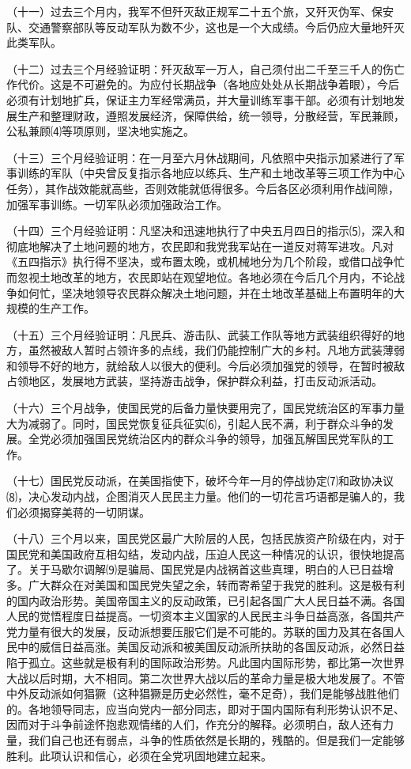 \documentclass[UTF-8, a5paper, 12pt]{ctexart}
\begin{document}
（十一）过去三个月内，我军不但歼灭敌正规军二十五个旅，又歼灭伪军、保安队、交通警察部队等反动军队为数不少，这也是一个大成绩。今后仍应大量地歼灭此类军队。

（十二）过去三个月经验证明：歼灭敌军一万人，自己须付出二千至三千人的伤亡作代价。这是不可避免的。为应付长期战争（各地应处处从长期战争着眼），今后必须有计划地扩兵，保证主力军经常满员，并大量训练军事干部。必须有计划地发展生产和整理财政，遵照发展经济，保障供给，统一领导，分散经营，军民兼顾，公私兼顾⑷等项原则，坚决地实施之。

（十三）三个月经验证明：在一月至六月休战期间，凡依照中央指示加紧进行了军事训练的军队（中央曾反复指示各地应以练兵、生产和土地改革等三项工作为中心任务），其作战效能就高些，否则效能就低得很多。今后各区必须利用作战间隙，加强军事训练。一切军队必须加强政治工作。

（十四）三个月经验证明：凡坚决和迅速地执行了中央五月四日的指示⑸，深入和彻底地解决了土地问题的地方，农民即和我党我军站在一道反对蒋军进攻。凡对《五四指示》执行得不坚决，或布置太晚，或机械地分为几个阶段，或借口战争忙而忽视土地改革的地方，农民即站在观望地位。各地必须在今后几个月内，不论战争如何忙，坚决地领导农民群众解决土地问题，并在土地改革基础上布置明年的大规模的生产工作。

（十五）三个月经验证明：凡民兵、游击队、武装工作队等地方武装组织得好的地方，虽然被敌人暂时占领许多的点线，我们仍能控制广大的乡村。凡地方武装薄弱和领导不好的地方，就给敌人以很大的便利。今后必须加强党的领导，在暂时被敌占领地区，发展地方武装，坚持游击战争，保护群众利益，打击反动派活动。

（十六）三个月战争，使国民党的后备力量快要用完了，国民党统治区的军事力量大为减弱了。同时，国民党恢复征兵征实⑹，引起人民不满，利于群众斗争的发展。全党必须加强国民党统治区内的群众斗争的领导，加强瓦解国民党军队的工作。

（十七）国民党反动派，在美国指使下，破坏今年一月的停战协定⑺和政协决议⑻，决心发动内战，企图消灭人民民主力量。他们的一切花言巧语都是骗人的，我们必须揭穿美蒋的一切阴谋。

（十八）三个月以来，国民党区最广大阶层的人民，包括民族资产阶级在内，对于国民党和美国政府互相勾结，发动内战，压迫人民这一种情况的认识，很快地提高了。关于马歇尔调解⑼是骗局、国民党是内战祸首这些真理，明白的人已日益增多。广大群众在对美国和国民党失望之余，转而寄希望于我党的胜利。这是极有利的国内政治形势。美国帝国主义的反动政策，已引起各国广大人民日益不满。各国人民的觉悟程度日益提高。一切资本主义国家的人民民主斗争日益高涨，各国共产党力量有很大的发展，反动派想要压服它们是不可能的。苏联的国力及其在各国人民中的威信日益高涨。美国反动派和被美国反动派所扶助的各国反动派，必然日益陷于孤立。这些就是极有利的国际政治形势。凡此国内国际形势，都比第一次世界大战以后时期，大不相同。第二次世界大战以后的革命力量是极大地发展了。不管中外反动派如何猖獗（这种猖獗是历史必然性，毫不足奇），我们是能够战胜他们的。各地领导同志，应当向党内一部分同志，即对于国内国际有利形势认识不足、因而对于斗争前途怀抱悲观情绪的人们，作充分的解释。必须明白，敌人还有力量，我们自己也还有弱点，斗争的性质依然是长期的，残酷的。但是我们一定能够胜利。此项认识和信心，必须在全党巩固地建立起来。
\end{document}
